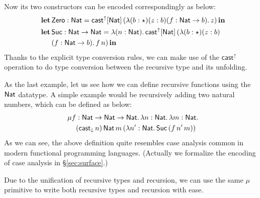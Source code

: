 Now its two constructors can be encoded correspondingly as below:
\begin{align*}
  \mathbf{let}\,&\mathsf{Zero} : \mathsf{Nat} = \mathsf{cast}^\uparrow[\mathsf{Nat}]\,(\lambda (b : \star) (z : b) (f : \mathsf{Nat} \rightarrow b).\,z)\,\mathbf{in} \\
  \mathbf{let}\,&\mathsf{Suc} : \mathsf{Nat} \rightarrow \mathsf{Nat} = \lambda (n : \mathsf{Nat}).\,\mathsf{cast}^\uparrow[\mathsf{Nat}]\,(\lambda (b : \star) (z : b)\\ &(f : \mathsf{Nat} \rightarrow b).\,f\,n)\,\mathbf{in}
\end{align*}
Thanks to the explicit type conversion rules, we can make use of the $ \mathsf{cast}^{\uparrow} $ operation to do type conversion between the recursive type and its unfolding.

As the last example, let us see how we can define recursive functions using the $\mathsf{Nat}$ datatype. A simple example would be recursively adding two natural numbers, which can be defined as below:
\begin{align*}
  \mu f &: \mathsf{Nat} \rightarrow \mathsf{Nat} \rightarrow \mathsf{Nat}.\,\lambda n : \mathsf{Nat}.\,\lambda m : \mathsf{Nat}.\\
  &(\mathsf{cast}_\downarrow\,n)\,\mathsf{Nat}\,m\,(\lambda n':\mathsf{Nat}.\,\mathsf{Suc}\,(f\,n'\,m))
\end{align*}
As we can see, the above definition quite resembles case analysis common in modern functional programming languages. (Actually we formalize the encoding of case analysis in \S\ref{sec:surface}.)

Due to the unification of recursive types and recursion, we can use the same $\mu$ primitive to write both recursive types and recursion with ease.

